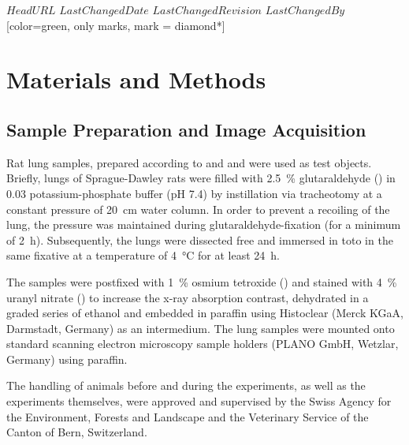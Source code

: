 \svnidlong
{$HeadURL$}
{$LastChangedDate$}
{$LastChangedRevision$}
{$LastChangedBy$}[color=green, only marks, mark = diamond*]
%
\section{Materials and Methods}
\label{sec:materials and methods}
\subsection{Sample Preparation and Image Acquisition}
Rat lung samples, prepared according to %
\ifhtml
	\citet{Tschanz2002} and \citet{Luyet2002}
\else
	 and 
\fi%
were used as test objects. Briefly, lungs of Sprague-Dawley rats were filled with \SI{2.5}{\percent} glutaraldehyde () in \SI{0.03}{\Molar} potassium-phosphate buffer (pH 7.4) by instillation via tracheotomy at a constant pressure of \SI{20}{\centi\meter} water column. In order to prevent a recoiling of the lung, the pressure was maintained during glutaraldehyde-fixation (for a minimum of \SI{2}{\hour}). Subsequently, the lungs were dissected free and immersed in toto in the same fixative at a temperature of \SI{4}{\celsius} for at least \SI{24}{\hour}.

The samples were postfixed with \SI{1}{\percent} osmium tetroxide () and stained with \SI{4}{\percent} uranyl nitrate () to increase the x-ray absorption contrast, dehydrated in a graded series of ethanol and embedded in paraffin using Histoclear (Merck KGaA, Darmstadt, Germany) as an intermedium. The lung samples were mounted onto standard scanning electron microscopy sample holders (PLANO GmbH, Wetzlar, Germany) using paraffin.

The handling of animals before and during the experiments, as well as the experiments themselves, were approved and supervised by the Swiss Agency for the Environment, Forests and Landscape and the Veterinary Service of the Canton of Bern, Switzerland.


